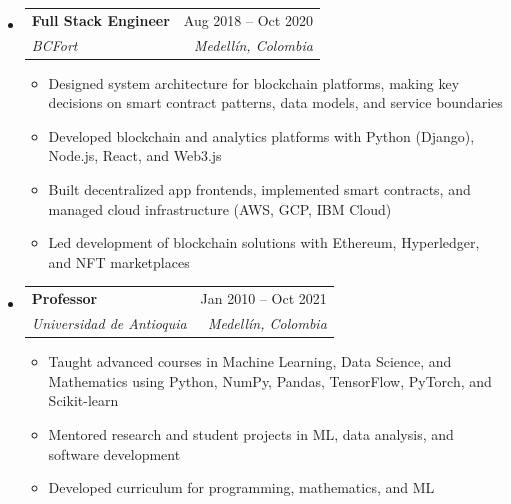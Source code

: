 \documentclass[letterpaper,11pt]{article}
\makeatletter
\newcommand{\resumeSubheading}[4]{
  \vspace{-2pt}
  \item[]
  \begin{tabular*}{\textwidth}{@{\extracolsep{\fill}}l r}
    \textbf{#1} & #2 \\
    \textit{#3} & \textit{#4} \\
  \end{tabular*}
  \vspace{-5pt}
}
\makeatother
\begin{document}
\begin{itemize}[leftmargin=0pt, itemindent=0pt, label={}, itemsep=1pt]
\resumeSubheading
{Full Stack Engineer}{Aug 2018 -- Oct 2020}
{BCFort}{Medellín, Colombia}
\begin{itemize}[leftmargin=*, itemsep=0pt]
    \item Designed system architecture for blockchain platforms, making key decisions on smart contract patterns, data models, and service boundaries
    \item Developed blockchain and analytics platforms with Python (Django), Node.js, React, and Web3.js
    \item Built decentralized app frontends, implemented smart contracts, and managed cloud infrastructure (AWS, GCP, IBM Cloud)
    \item Led development of blockchain solutions with Ethereum, Hyperledger, and NFT marketplaces
\end{itemize}

\resumeSubheading
{Professor}{Jan 2010 -- Oct 2021}
{Universidad de Antioquia}{Medellín, Colombia}
\begin{itemize}[leftmargin=*, itemsep=0pt]
    \item Taught advanced courses in Machine Learning, Data Science, and Mathematics using Python, NumPy, Pandas, TensorFlow, PyTorch, and Scikit-learn
    \item Mentored research and student projects in ML, data analysis, and software development
    \item Developed curriculum for programming, mathematics, and ML
\end{itemize}
\end{itemize}
\end{document}
